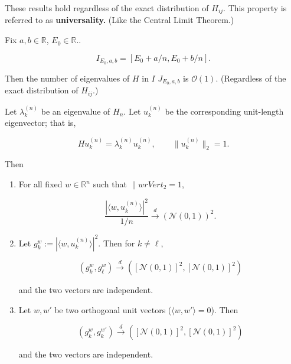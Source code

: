 These results hold regardless of the exact distribution of \(H_{ij}\). This property is referred to as \textbf{universality.} (Like the Central Limit Theorem.)

\begin{proposition}

Fix \(a, b \in \mathbb{R}\), \(E_0 \in \mathbb{R}\).. 

\[
I_{E_0 , a , b} = [ E_0 + a/n, E_0 + b/n].
\]

Then the number of eigenvalues of \(H\) in \(I\) \(J_{E_0, a, b}\) is \(\mathcal{O}(1)\). (Regardless of the exact distribution of \(H_{ij}\).)

\end{proposition}

\begin{proposition}

Let \(\lambda_k^{(n)}\) be an eigenvalue of \(H_n\). Let \(u_k^{(n)}\) be the corresponding unit-length eigenvector; that is,

\[
H u_k^{(n)} = \lambda_k^{(n)} u_k^{(n)}, \qquad \lVert u_k^{(n)} \rVert_2 = 1.
\]

Then 

\begin{enumerate}

\item For all fixed \(w \in \mathbb{R}^n\) such that \(\lVert w rVert_2 =1\),

\[
\frac{| \langle w, u_k^{(n)} \rangle |^2}{1/n} \xrightarrow{d} \left( \mathcal{N} (0,1) \right)^2.
\]

\item Let \(g_k^w := | \langle w, u_k^{(n)} \rangle |^2\). Then for \(k \neq \ell\), 

\[
(g_k^w, g_\ell^w) \xrightarrow{d} \left( \left[ \mathcal{N}(0,1) \right]^2,  \left[ \mathcal{N}(0,1) \right]^2 \right)
\]

and the two vectors are independent.

\item Let \(w, w'\) be two orthogonal unit vectors (\(\langle w, w' \rangle = 0\)). Then 

\[
(g_k^w, g_k^{w'}) \xrightarrow{d} \left( \left[ \mathcal{N}(0,1) \right]^2,  \left[ \mathcal{N}(0,1) \right]^2 \right)
\]

and the two vectors are independent.


\end{enumerate}

\end{proposition}



